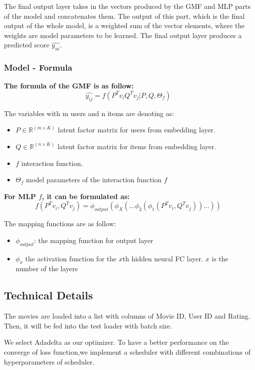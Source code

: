 \documentclass[final]{cvpr}
\begin{document}
The final output layer takes in the vectors produced by the GMF and MLP parts of the model and concatenates them. The output of this part, which is the final output of the whole model, is a weighted sum of the vector elements, where the weights are model parameters to be learned. The final output layer produces a predicted score $\hat{y_{ui}}$.

\subsubsection{Model - Formula}
\bigskip
\textbf{ The formula of the GMF is as follow:}
$$\hat{y_{ij}} = f(P^T v_i Q^T v_j|P,Q,\Theta_f)$$

The variables with m users and n items are denoting as:
\begin{itemize}
    \item $P \in \mathbb{R}^{(m \times K)}$ latent factor matrix for users from embedding layer.
    \item $Q \in \mathbb{R} ^{(n \times K)}$ latent factor matrix for items from embedding layer.
    \item $f$ interaction function.    
    \item $\Theta_{f}$ model parameters of the interaction function $f$
\end{itemize}

\bigskip
\textbf{ For MLP $f$, it can be formulated as:}
$$f(P^T v_i, Q^T v_j) = \phi_{output}(\phi_X(...\phi_2(\phi_1(P^T v_i, Q^T v_j))...))$$

The mapping functions are as follow:
\begin{itemize}
    \item $\phi_{output}$: the mapping function for output layer
    \item $\phi_x$ the activation function for the $x$th hidden neural FC layer. $x$ is the number of the layers
\end{itemize}

\subsection{Technical Details}

The movies are loaded into a list with columns of Movie ID, User ID and Rating. Then, it will be fed into the test loader with batch size.

We select Adadelta as our optimizer. 
To have a better performance on the converge of loss function,we implement a scheduler with different combinations of hyperparameters of scheduler.
\end{document}
